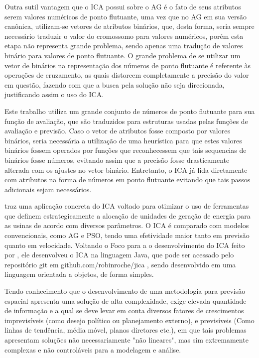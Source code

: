 Outra sutil vantagem que o ICA possui sobre o AG é o fato de seus atributos serem valores numéricos de ponto flutuante, uma vez que no AG em sua versão canônica, utilizam-se vetores de atributos binários, que, desta forma, seria sempre necessário traduzir o valor do cromossomo para valores numéricos, porém esta etapa não representa grande problema, sendo apenas uma tradução de valores binário para valores de ponto flutuante. O grande problema de se utilizar um vetor de binários na representação dos números de ponto flutuante é referente às operações de cruzamento, as quais distorcem completamente a precisão do valor em questão, fazendo com que a busca pela solução não seja direcionada, justificando assim o uso do ICA.

Este trabalho utiliza um grande conjunto de números de ponto flutuante para sua função de avaliação, que são traduzidos para estruturas usadas pelas funções de avaliação e previsão. Caso o vetor de atributos fosse composto por valores binários, seria necessária a utilização de uma heurística para que estes valores binários fossem operados por funções que reconhecessem que tais sequencias de binários fosse números, evitando assim que a precisão fosse drasticamente alterada com os ajustes no vetor binário. Entretanto, o ICA já lida diretamente com atributos na forma de números em ponto flutuante evitando que tais passos adicionais sejam necessários.

\cite{roche2011imperialist} traz uma aplicação concreta do ICA voltado para otimizar o uso de ferramentas que definem estrategicamente a alocação de unidades de geração de energia para as usinas de acordo com diversos parâmetros. O ICA é comparado com modelos convencionais, como AG e PSO, tendo uma efetividade maior tanto em previsão quanto em velocidade. Voltando o Foco para a o desenvolvimento do ICA feito por \citeauthor{roche2011imperialist}, ele desenvolveu o ICA na linguagem Java, que pode ser acessado pelo repositório git em github.com/robinroche/jica \cite{jica}, sendo desenvolvido em uma linguagem orientada a objetos, de forma simples. 

Tendo conhecimento que o desenvolvimento de uma metodologia para previsão espacial apresenta uma solução de alta complexidade, exige elevada quantidade de informação e a qual se deve levar em conta diversos fatores de crescimentos imprevisíveis (como desejo político ou planejamento externo), e previsíveis (Como linhas de tendência, média móvel, planos diretores etc.), em que tais problemas apresentam soluções não necessariamente "não lineares", mas sim extremamente complexas e não controláveis para a modelagem e análise. 

